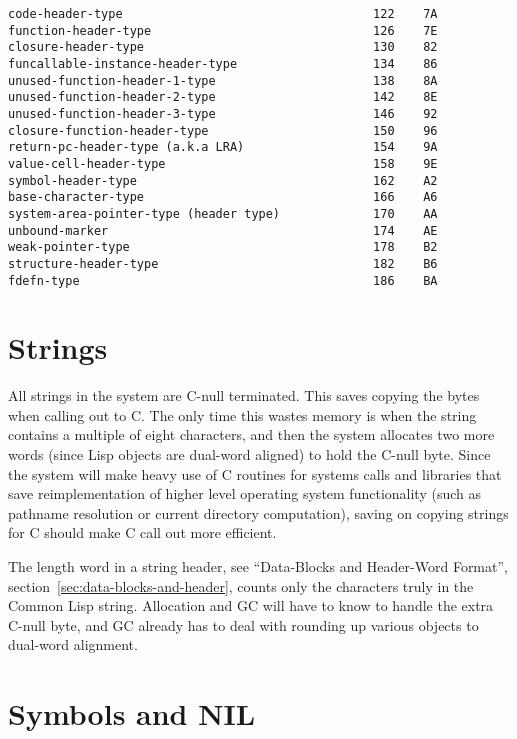 \begin{verbatim}
code-header-type                                   122    7A
function-header-type                               126    7E
closure-header-type                                130    82
funcallable-instance-header-type                   134    86
unused-function-header-1-type                      138    8A
unused-function-header-2-type                      142    8E
unused-function-header-3-type                      146    92
closure-function-header-type                       150    96
return-pc-header-type (a.k.a LRA)                  154    9A
value-cell-header-type                             158    9E
symbol-header-type                                 162    A2
base-character-type                                166    A6
system-area-pointer-type (header type)             170    AA
unbound-marker                                     174    AE
weak-pointer-type                                  178    B2
structure-header-type                              182    B6
fdefn-type                                         186    BA
\end{verbatim}

\section{Strings}

All strings in the system are C-null terminated.  This saves copying the bytes
when calling out to C.  The only time this wastes memory is when the string
contains a multiple of eight characters, and then the system allocates two more
words (since Lisp objects are dual-word aligned) to hold the C-null byte.
Since the system will make heavy use of C routines for systems calls and
libraries that save reimplementation of higher level operating system
functionality (such as pathname resolution or current directory computation),
saving on copying strings for C should make C call out more efficient.

The length word in a string header, see ``Data-Blocks and Header-Word
Format'', section~\ref{sec:data-blocks-and-header}, counts only the characters truly in the Common Lisp string.
Allocation and GC will have to know to handle the extra C-null byte, and GC
already has to deal with rounding up various objects to dual-word alignment.



\section{Symbols and NIL}

